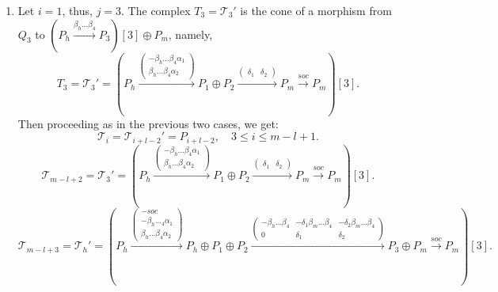 \documentclass[12pt]{amsart}
\theoremstyle{plain}
\theoremstyle{remark}
\theoremstyle{definition}
\begin{document}
\begin{enumerate}
\begin{enumerate}
\begin{enumerate}
Applying the rest of $(\widetilde{\mu}^{st}_{\mu^+_{m_1+3}(G)})^{-1}$, we get 
$$\mathcal{T}_{m_1+3} = \mathcal{T}_{m_1+3}' = P_h, $$
$$\mathcal{T}_i = \mathcal{T}_{i-1}' = (P_h \xrightarrow{soc} P_h \xrightarrow{\beta_4 \dots \beta_i} P_{i-1}), \quad m_1+5 \leq i \leq h,$$
$$\mathcal{T}_{m_1+4}= \mathcal{T}_h' = (P_h \xrightarrow{soc} P_h \xrightarrow{\beta_4 \dots \beta_{m_1+4}} P_{m_1+3}),$$
$$\mathcal{T}_i = \mathcal{T}_i' = P_i \text{ otherwise.} $$

We have $\mathcal{H}(\Lambda) = t_{m_1+4}^{-1} \circ \dots \circ t_h^{-1}(\Lambda)$.  

 
 \item\label{difcase3} Let $i=1$, thus, $j=3$. The complex $T_3 = \mathcal{T}_3'$ is the cone of a morphism from $Q_3$ to $(P_h \xrightarrow{\beta_h \dots \beta_4} P_3)[3]\oplus P_{m}$, namely, 
$$ T_3 = \mathcal{T}_3' = (P_h \xrightarrow{\begin{pmatrix} -\beta_h \dots \beta_4\alpha_1 \\ \beta_h \dots \beta_4\alpha_2 \end{pmatrix}} P_1\oplus P_2 \xrightarrow{\begin{pmatrix} \delta_1 & \delta_2 \end{pmatrix}} P_{m} \xrightarrow{soc} P_{m})[3]. $$
Then proceeding as in the previous two cases, we get: 
$$\mathcal{T}_i = \mathcal{T}_{i+l-2}' = P_{i+l-2}, \quad 3 \leq i \leq m-l+1. $$ 
$$\mathcal{T}_{m-l+2} = \mathcal{T}_3' = (P_h \xrightarrow{\begin{pmatrix} -\beta_h \dots \beta_4\alpha_1 \\ \beta_h \dots \beta_4\alpha_2 \end{pmatrix}} P_1\oplus P_2 \xrightarrow{\begin{pmatrix} \delta_1 & \delta_2 \end{pmatrix}} P_{m} \xrightarrow{soc} P_{m})[3]. $$
$$\mathcal{T}_{m-l+3} = \mathcal{T}_h' = (P_h \xrightarrow{\begin{pmatrix} -soc \\ -\beta_h \dots_4\alpha_1 \\ \beta_h \dots \beta_4 \alpha_2 \end{pmatrix}} P_h \oplus P_1 \oplus P_{2} \xrightarrow{\begin{pmatrix} -\beta_h \dots \beta_4 & -\delta_1 \beta_m \dots \beta_4 & -\delta_2 \beta_m \dots \beta_4 \\ 0 & \delta_1 & \delta_2 \end{pmatrix}} P_3 \oplus P_{m} \xrightarrow{soc} P_{m})[3].$$ 

\end{enumerate}
\end{enumerate}
\end{enumerate}
\end{document}
